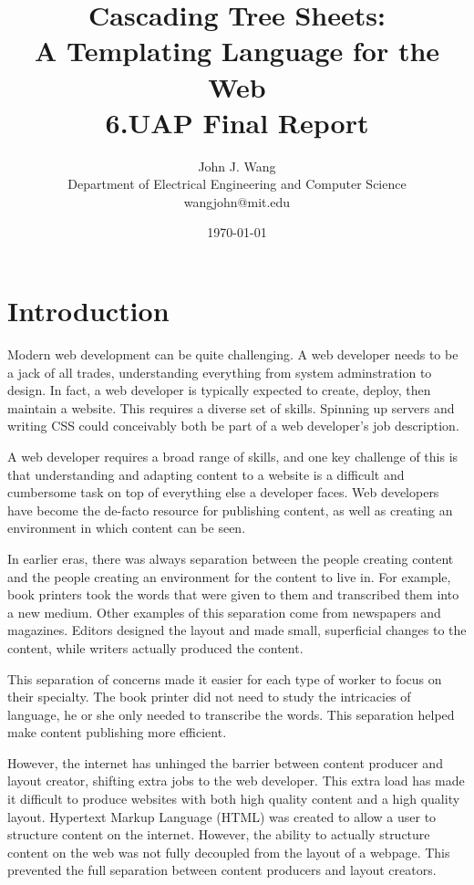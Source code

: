 \documentclass[12pt]{article}
\title{Cascading Tree Sheets:\\ 
A Templating Language for the Web\\
6.UAP Final Report
}
\author{
John J. Wang\\
Department of Electrical Engineering and Computer Science\\
wangjohn@mit.edu
}
\date{\today}
\begin{document}
\maketitle

\section{Introduction}

Modern web development can be quite challenging. A web developer needs to be a jack of all trades, understanding everything from system adminstration to design. In fact, a web developer is typically expected to create, deploy, then maintain a website. This requires a diverse set of skills. Spinning up servers and writing CSS could conceivably both be part of a web developer's job description.

A web developer requires a broad range of skills, and one key challenge of this is that understanding and adapting content to a website is a difficult and cumbersome task on top of everything else a developer faces. Web developers have become the de-facto resource for publishing content, as well as creating an environment in which content can be seen.

In earlier eras, there was always separation between the people creating content and the people creating an environment for the content to live in. For example, book printers took the words that were given to them and transcribed them into a new medium. Other examples of this separation come from newspapers and magazines. Editors designed the layout and made small, superficial changes to the content, while writers actually produced the content.

This separation of concerns made it easier for each type of worker to focus on their specialty. The book printer did not need to study the intricacies of language, he or she only needed to transcribe the words. This separation helped make content publishing more efficient.

However, the internet has unhinged the barrier between content producer and layout creator, shifting extra jobs to the web developer. This extra load has made it difficult to produce websites with both high quality content and a high quality layout. Hypertext Markup Language (HTML) was created to allow a user to structure content on the internet. However, the ability to actually structure content on the web was not fully decoupled from the layout of a webpage. This prevented the full separation between content producers and layout creators.
\end{document}
